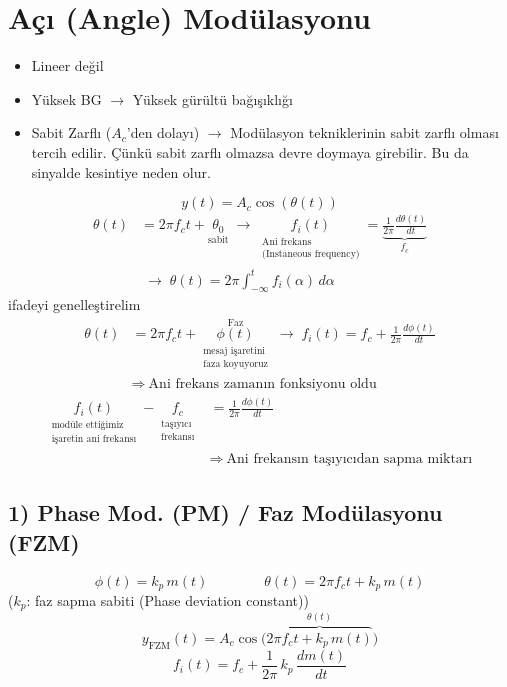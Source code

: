 \documentclass[11pt,a4paper]{article}
\begin{document}
\section{Açı (Angle) Modülasyonu}
\begin{itemize}
\item Lineer değil
\item Yüksek BG $\to$ Yüksek gürültü bağışıklığı
\item Sabit Zarflı ($A_c$'den dolayı) $\to$ Modülasyon tekniklerinin sabit zarflı olması tercih edilir. Çünkü sabit zarflı olmazsa devre doymaya girebilir. Bu da sinyalde kesintiye neden olur.
\end{itemize}
\[ y(t)=A_c\cos(\theta(t)) \]
\begin{align*}
\theta(t)&=2\pi f_c t+\underset{\text{sabit}}{\theta_0} \;\to\; \underset{\substack{\text{Ani frekans}\\ \text{(Instaneous frequency)}}}{f_i(t)}=\underbrace{\frac{1}{2\pi}\frac{d\theta(t)}{dt}}_{f_c}\\
&\;\to\; \theta(t)=2\pi\int_{-\infty}^{t} f_i(\alpha)\,d\alpha
\end{align*}
ifadeyi genelleştirelim
\begin{align*}
\theta(t)&=2\pi f_c t+\underset{\substack{\text{mesaj işaretini}\\ \text{faza koyuyoruz}}}{\overset{\text{Faz}}{\phi(t)}} \;\to\; f_i(t)=f_c+\frac{1}{2\pi}\frac{d\phi(t)}{dt}\\
&\Rightarrow\ \text{Ani frekans zamanın fonksiyonu oldu}
\end{align*}
\begin{align*}
\underset{\substack{\text{modüle ettiğimiz}\\ \text{işaretin ani frekansı}}}{f_i(t)}-\underset{\substack{\text{taşıyıcı}\\ \text{frekansı}}}{f_c}&=\frac{1}{2\pi}\frac{d\phi(t)}{dt}\\
&\Rightarrow\ \text{Ani frekansın taşıyıcıdan sapma miktarı}
\end{align*}

\subsection{1) Phase Mod. (PM) / Faz Modülasyonu (FZM)}
\[ \phi(t)=k_p\, m(t) \qquad\qquad \theta(t)=2\pi f_c t+k_p\, m(t) \]
($k_p$: faz sapma sabiti (Phase deviation constant))
\[ y_{\mathrm{FZM}}(t)=A_c\cos\Big(\overbrace{2\pi f_c t+k_p\, m(t)}^{\theta(t)}\Big) \]
\[ f_i(t)=f_c+\frac{1}{2\pi}\,k_p\,\frac{dm(t)}{dt} \]
\end{document}
